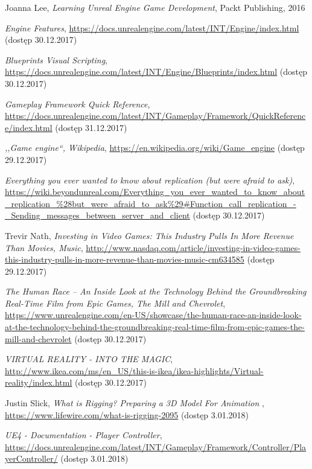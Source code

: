 \documentclass[multip]{SGGW-thesis}
\begin{document}
\begin{thebibliography}{9}

Joanna Lee, \textit{Learning Unreal Engine Game Development}, Packt Publishing, 2016

\textit{Engine Features}, \url{https://docs.unrealengine.com/latest/INT/Engine/index.html} (dostęp 30.12.2017)

\textit{Blueprints Visual Scripting}, \url{https://docs.unrealengine.com/latest/INT/Engine/Blueprints/index.html} (dostęp 30.12.2017)

\textit{Gameplay Framework Quick Reference}, \url{https://docs.unrealengine.com/latest/INT/Gameplay/Framework/QuickReference/index.html} (dostęp 31.12.2017)

\textit{,,Game engine``, Wikipedia}, \url{https://en.wikipedia.org/wiki/Game_engine} {\mbox(dostęp 29.12.2017)}

\textit{Everything you ever wanted to know about replication (but were afraid to ask)}, \url{https://wiki.beyondunreal.com/Everything_you_ever_wanted_to_know_about_replication_\%28but_were_afraid_to_ask\%29#Function_call_replication_-_Sending_messages_between_server_and_client} (dostęp 30.12.2017)

Trevir Nath, \textit{Investing in Video Games: This Industry Pulls In More Revenue Than Movies, Music},
\url{http://www.nasdaq.com/article/investing-in-video-games-this-industry-pulls-in-more-revenue-than-movies-music-cm634585} {\mbox(dostęp 29.12.2017)}

\textit{The Human Race – An Inside Look at the Technology Behind the Groundbreaking Real-Time Film from Epic Games, The Mill and Chevrolet}, \url{https://www.unrealengine.com/en-US/showcase/the-human-race-an-inside-look-at-the-technology-behind-the-groundbreaking-real-time-film-from-epic-games-the-mill-and-chevrolet} (dostęp 30.12.2017)

\textit{VIRTUAL REALITY - INTO THE MAGIC}, \url{http://www.ikea.com/ms/en_US/this-is-ikea/ikea-highlights/Virtual-reality/index.html} (dostęp 30.12.2017)

Justin Slick, \textit{What is Rigging? Preparing a 3D Model For Animation }, \url{https://www.lifewire.com/what-is-rigging-2095}  (dostęp 3.01.2018)

\textit{UE4 - Documentation - Player Controller}, \url{https://docs.unrealengine.com/latest/INT/Gameplay/Framework/Controller/PlayerController/}  (dostęp 3.01.2018)


\end{thebibliography}
\end{document}

